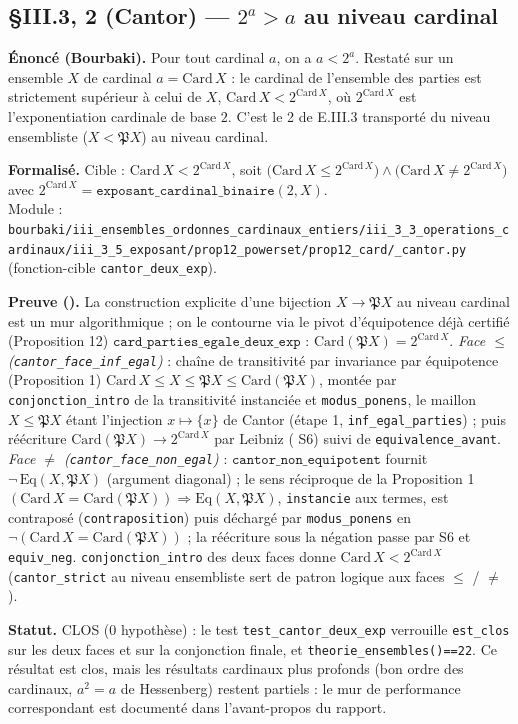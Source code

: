 \subsection{§III.3, \theoreme{} 2 (Cantor) --- $2^{a} > a$ au niveau cardinal}
\textbf{Énoncé (Bourbaki).} Pour tout cardinal $a$, on a $a < 2^{a}$. Restaté sur
un ensemble $X$ de cardinal $a = \mathrm{Card}\,X$ : le cardinal de l'ensemble des
parties est strictement supérieur à celui de $X$, $\mathrm{Card}\,X < 2^{\mathrm{Card}\,X}$,
où $2^{\mathrm{Card}\,X}$ est l'exponentiation cardinale de base $2$. C'est le
\theoreme{} 2 de E.III.3 transporté du niveau ensembliste ($X < \mathfrak{P}X$) au
niveau cardinal.

\textbf{Formalisé.} Cible : $\mathrm{Card}\,X < 2^{\mathrm{Card}\,X}$, soit
$\bigl(\mathrm{Card}\,X \le 2^{\mathrm{Card}\,X}\bigr) \wedge \bigl(\mathrm{Card}\,X \neq 2^{\mathrm{Card}\,X}\bigr)$
avec $2^{\mathrm{Card}\,X} = \texttt{exposant\_cardinal\_binaire}(2, X)$. \\
Module : \texttt{bourbaki/iii\_ensembles\_ordonnes\_cardinaux\_entiers/iii\_3\_3\_operations\_cardinaux/iii\_3\_5\_exposant/prop12\_powerset/prop12\_card/\_cantor.py}
(fonction-cible \texttt{cantor\_deux\_exp}).

\textbf{Preuve (\Nstar).} La construction explicite d'une bijection $X \to \mathfrak{P}X$
au niveau cardinal est un mur algorithmique ; on le contourne via le pivot d'équipotence
déjà certifié (Proposition 12) $\texttt{card\_parties\_egale\_deux\_exp}$ :
$\mathrm{Card}(\mathfrak{P}X) = 2^{\mathrm{Card}\,X}$. \emph{Face $\le$
(\texttt{cantor\_face\_inf\_egal})} : chaîne de transitivité par invariance par équipotence
(Proposition 1) $\mathrm{Card}\,X \le X \le \mathfrak{P}X \le \mathrm{Card}(\mathfrak{P}X)$,
montée par \texttt{conjonction\_intro} de la transitivité instanciée et
\texttt{modus\_ponens}, le maillon $X \le \mathfrak{P}X$ étant l'injection $x \mapsto \{x\}$
de Cantor (étape 1, \texttt{inf\_egal\_parties}) ; puis réécriture
$\mathrm{Card}(\mathfrak{P}X) \to 2^{\mathrm{Card}\,X}$ par Leibniz (\noyau{} S6) suivi de
\texttt{equivalence\_avant}. \emph{Face $\neq$ (\texttt{cantor\_face\_non\_egal})} :
$\texttt{cantor\_non\_equipotent}$ fournit $\neg\,\mathrm{Eq}(X, \mathfrak{P}X)$
(argument diagonal) ; le sens réciproque de la Proposition 1
$(\mathrm{Card}\,X = \mathrm{Card}(\mathfrak{P}X)) \Rightarrow \mathrm{Eq}(X, \mathfrak{P}X)$,
\texttt{instancie} aux termes, est contraposé (\texttt{contraposition}) puis déchargé par
\texttt{modus\_ponens} en $\neg(\mathrm{Card}\,X = \mathrm{Card}(\mathfrak{P}X))$ ; la
réécriture sous la négation passe par S6 et \texttt{equiv\_neg}. \texttt{conjonction\_intro}
des deux faces donne $\mathrm{Card}\,X < 2^{\mathrm{Card}\,X}$ (\texttt{cantor\_strict} au
niveau ensembliste sert de patron logique aux faces $\le$ / $\neq$).

\textbf{Statut.} CLOS (0 hypothèse) : le test \texttt{test\_cantor\_deux\_exp} verrouille
\texttt{est\_clos} sur les deux faces et sur la conjonction finale, et
\texttt{theorie\_ensembles()==22}. Ce résultat est clos, mais les résultats cardinaux plus
profonds (bon ordre des cardinaux, $a^{2} = a$ de Hessenberg) restent partiels : le mur de
performance correspondant est documenté dans l'avant-propos du rapport.
